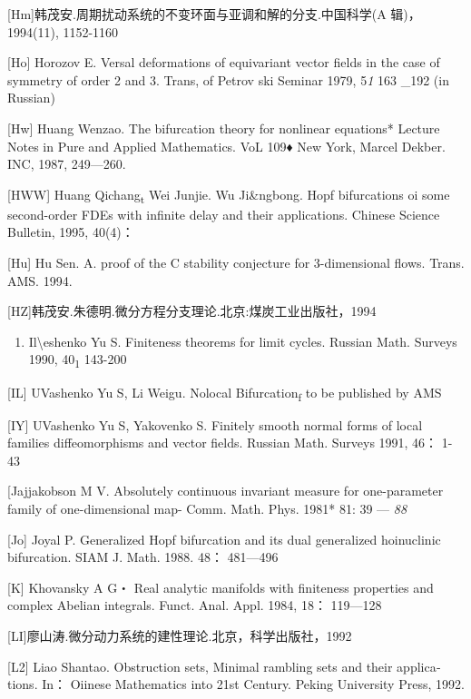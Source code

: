 {[}Hm{]}韩茂安.周期扰动系统的不变环面与亚调和解的分支.中国科学(A
辑)，1994(11), 1152-1160

{[}Ho{]} Horozov E. Versal deformations of equivariant vector fields in
the case of symmetry of order 2 and 3. Trans, of Petrov ski Seminar
1979, 5\emph{1} 163 \_192 (in Russian)

{[}Hw{]} Huang Wenzao. The bifurcation theory for nonlinear equations*
Lecture Notes in Pure and Applied Mathematics. VoL 109♦ New York, Marcel
Dekber. INC, 1987, 249---260.

{[}HWW{]} Huang Qichang\textsubscript{t} Wei Junjie. Wu Ji\&ngbong. Hopf
bifurcations oi some second-order FDEs with infinite delay and their
applications. Chinese Science Bulletin, 1995, 40(4)：

{[}Hu{]} Hu Sen. A. proof of the C stability conjecture for
3-dimensional flows. Trans. AMS. 1994.

{[}HZ{]}韩茂安.朱德明.微分方程分支理论.北京:煤炭工业出版社，1994

\begin{enumerate}
\def\labelenumi{\Alph{enumi}.}
\setcounter{enumi}{8}
\item
  Il\textbackslash{}eshenko Yu S. Finiteness theorems for limit cycles.
  Russian Math. Surveys 1990, 40\textsubscript{1} 143-200
\end{enumerate}

{[}IL{]} UVashenko Yu S, Li Weigu. Nolocal Bifurcation\textsubscript{f}
to be published by AMS

{[}IY{]} UVashenko Yu S, Yakovenko S. Finitely smooth normal forms of
local families diffeomorphisms and vector fields. Russian Math. Surveys
1991, 46： 1-43

{[}Jajjakobson M V. Absolutely continuous invariant measure for
one-parame­ter family of one-dimensional map- Comm. Math. Phys. 1981*
81: 39 --- \emph{88}

{[}Jo{]} Joyal P. Generalized Hopf bifurcation and its dual generalized
hoinuclinic bifurcation. SIAM J. Math. 1988. 48： 481---496

{[}K{]} Khovansky A G・ Real analytic manifolds with finiteness
properties and complex Abelian integrals. Funct. Anal. Appl. 1984, 18：
119---128

{[}LI{]}廖山涛.微分动力系统的建性理论.北京，科学出版社，1992

{[}L2{]} Liao Shantao. Obstruction sets, Minimal rambling sets and their
applica­tions. In： Oiinese Mathematics into 21st Century. Peking
University Press, 1992.

